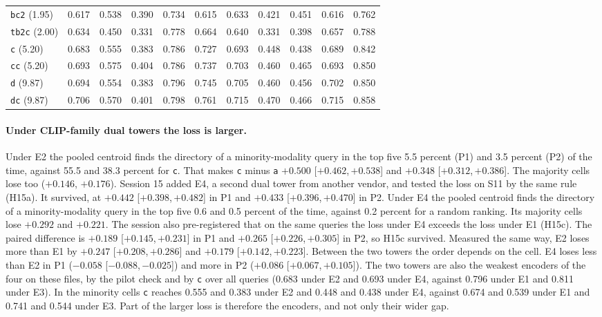 \documentclass[11pt]{article}
\newcommand{\rep}[1]{\texttt{#1}}
\newcommand{\ci}[2]{[\ensuremath{#1},\,\ensuremath{#2}]}  %
\begin{document}
\begin{table}[t]
\begin{tabular}{lrrrrrrrrrr}
\rep{bc2} (1.95) & 0.617 & 0.538 & 0.390 & 0.734 & 0.615 & 0.633 & 0.421 & 0.451 & 0.616 & 0.762 \\
\rep{tb2c} (2.00) & 0.634 & 0.450 & 0.331 & 0.778 & 0.664 & 0.640 & 0.331 & 0.398 & 0.657 & 0.788 \\
\rep{c} (5.20) & 0.683 & 0.555 & 0.383 & 0.786 & 0.727 & 0.693 & 0.448 & 0.438 & 0.689 & 0.842 \\
\rep{cc} (5.20) & 0.693 & 0.575 & 0.404 & 0.786 & 0.737 & 0.703 & 0.460 & 0.465 & 0.693 & 0.850 \\
\rep{d} (9.87) & 0.694 & 0.554 & 0.383 & 0.796 & 0.745 & 0.705 & 0.460 & 0.456 & 0.702 & 0.850 \\
\rep{dc} (9.87) & 0.706 & 0.570 & 0.401 & 0.798 & 0.761 & 0.715 & 0.470 & 0.466 & 0.715 & 0.858 \\
\bottomrule
\end{tabular}
\end{table}

\paragraph{Under CLIP-family dual towers the loss is larger.} Under E2 the pooled centroid finds the directory of a minority-modality query in the top five 5.5 percent (P1) and 3.5 percent (P2) of the time, against 55.5 and 38.3 percent for \rep{c}. That makes \rep{c} minus \rep{a} $+0.500$ \ci{+0.462}{+0.538} and $+0.348$ \ci{+0.312}{+0.386}. The majority cells lose too ($+0.146$, $+0.176$). Session 15 added E4, a second dual tower from another vendor, and tested the loss on S11 by the same rule (H15a). It survived, at $+0.442$ \ci{+0.398}{+0.482} in P1 and $+0.433$ \ci{+0.396}{+0.470} in P2. Under E4 the pooled centroid finds the directory of a minority-modality query in the top five 0.6 and 0.5 percent of the time, against 0.2 percent for a random ranking. Its majority cells lose $+0.292$ and $+0.221$. The session also pre-registered that on the same queries the loss under E4 exceeds the loss under E1 (H15c). The paired difference is $+0.189$ \ci{+0.145}{+0.231} in P1 and $+0.265$ \ci{+0.226}{+0.305} in P2, so H15c survived. Measured the same way, E2 loses more than E1 by $+0.247$ \ci{+0.208}{+0.286} and $+0.179$ \ci{+0.142}{+0.223}. Between the two towers the order depends on the cell. E4 loses less than E2 in P1 ($-0.058$ \ci{-0.088}{-0.025}) and more in P2 ($+0.086$ \ci{+0.067}{+0.105}). The two towers are also the weakest encoders of the four on these files, by the pilot check and by \rep{c} over all queries (0.683 under E2 and 0.693 under E4, against 0.796 under E1 and 0.811 under E3). In the minority cells \rep{c} reaches 0.555 and 0.383 under E2 and 0.448 and 0.438 under E4, against 0.674 and 0.539 under E1 and 0.741 and 0.544 under E3. Part of the larger loss is therefore the encoders, and not only their wider gap.
\end{document}
